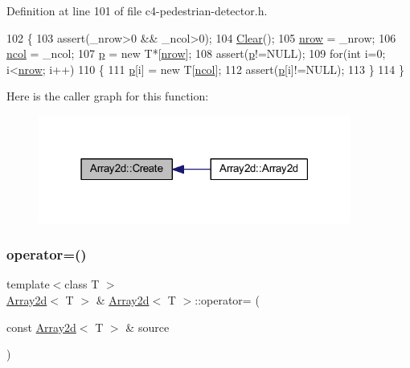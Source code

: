 Definition at line 101 of file c4-\/pedestrian-\/detector.\+h.


\begin{DoxyCode}
102 \{
103     assert(\_nrow>0 && \_ncol>0);
104     \mbox{\hyperlink{class_array2d_a9902a80867777fbf3ba64a6d8c10606e}{Clear}}();
105     \mbox{\hyperlink{class_array2d_a373dd63664bee40ef720d183d03e5bdb}{nrow}} = \_nrow;
106     \mbox{\hyperlink{class_array2d_afe48cd05774cae5b6872324ae49e089b}{ncol}} = \_ncol;
107     \mbox{\hyperlink{class_array2d_ac7b70bc423364c43c7c174cdde515380}{p}} = \textcolor{keyword}{new} T*[\mbox{\hyperlink{class_array2d_a373dd63664bee40ef720d183d03e5bdb}{nrow}}];
108     assert(\mbox{\hyperlink{class_array2d_ac7b70bc423364c43c7c174cdde515380}{p}}!=NULL);
109     \textcolor{keywordflow}{for}(\textcolor{keywordtype}{int} i=0; i<\mbox{\hyperlink{class_array2d_a373dd63664bee40ef720d183d03e5bdb}{nrow}}; i++)
110     \{
111         \mbox{\hyperlink{class_array2d_ac7b70bc423364c43c7c174cdde515380}{p}}[i] = \textcolor{keyword}{new} T[\mbox{\hyperlink{class_array2d_afe48cd05774cae5b6872324ae49e089b}{ncol}}];
112         assert(\mbox{\hyperlink{class_array2d_ac7b70bc423364c43c7c174cdde515380}{p}}[i]!=NULL);
113     \}
114 \}
\end{DoxyCode}
Here is the caller graph for this function\+:\nopagebreak
\begin{figure}[H]
\begin{center}
\leavevmode
\includegraphics[width=291pt]{class_array2d_af1d2cec0973cedfe74ae5b967532922f_icgraph}
\end{center}
\end{figure}
\mbox{\label{class_array2d_aa1c400a330cf1a31bd473bc3742ae51d}} 
\subsubsection{\texorpdfstring{operator=()}{operator=()}}
{\footnotesize\ttfamily template$<$class T $>$ \\
\mbox{\hyperlink{class_array2d}{Array2d}}$<$ T $>$ \& \mbox{\hyperlink{class_array2d}{Array2d}}$<$ T $>$\+::operator= (\begin{DoxyParamCaption}\item[{const \mbox{\hyperlink{class_array2d}{Array2d}}$<$ T $>$ \&}]{source }\end{DoxyParamCaption})}



